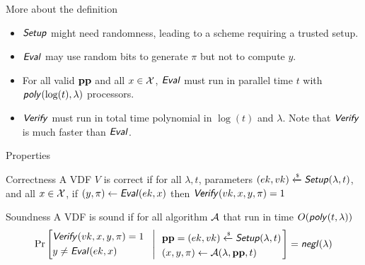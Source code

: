 \documentclass[UTF8]{beamer}
\begin{document}
	\begin{frame}{More about the definition}
		\begin{block}{}
			\begin{itemize}
				\item $\textsf{\textit{Setup}}$ might need randomness, leading to a scheme requiring a trusted setup.
				\item $\textsf{\textit{Eval}}$ may use random bits to generate $\pi$ but not to compute $y$.
				\item For all valid $\mathbf{pp}$ and all $x\in\mathcal{X}$, $\textsf{\textit{Eval}}$ must run in parallel time $t$ with $\textsf{\textit{poly}}(\log(t),\lambda)$ processors.
				\item $\textsf{\textit{Verify}}$ must run in total time polynomial in $\log(t)$ and $\lambda$. Note that $\textsf{\textit{Verify}}$ is much faster than $\textsf{\textit{Eval}}$.
			\end{itemize}
		\end{block}
	\end{frame}

	\begin{frame}{Properties}
		\begin{block}{Correctness}
			A VDF $V$ is correct if for all $\lambda, t$, parameters $(ek,vk)\xleftarrow{\text{\tiny$\mathsf{\$}$}}\textsf{\textit{Setup}}(\lambda,t)$, and all $x\in\mathcal{X}$, if $(y,\pi)\gets\textsf{\textit{Eval}}(ek,x)$ then $\textsf{\textit{Verify}}(vk,x,y,\pi)=1$
		\end{block}
		\begin{block}{Soundness}
			A VDF is sound if for all algorithm $\mathcal{A}$ that run in time $O(\textsf{\textit{poly}}(t,\lambda))$
			\begin{equation*}
				\Pr\left[
				\begin{aligned}
					&\textsf{\textit{Verify}}(vk,x,y,\pi)=1\\
					&y\neq\textsf{\textit{Eval}}(ek,x)
				\end{aligned}
				~~\left|~~
				\begin{aligned}
					&\mathbf{pp}=(ek,vk)\xleftarrow{\text{\tiny$\mathsf{\$}$}}\textsf{\textit{Setup}}(\lambda, t)\\
					&(x,y,\pi)\gets\mathcal{A}(\lambda,\mathbf{pp},t)
				\end{aligned}
				\right.\right]=\textsf{\textit{negl}}(\lambda)
			\end{equation*}
		\end{block}
	\end{frame}
\end{document}

